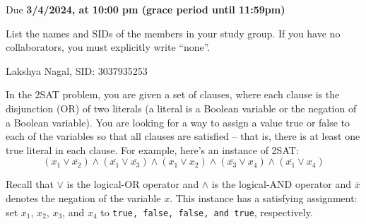 \documentclass[11pt]{article}
\def\duedate{3/4/2024, at 10:00 pm (grace period until 11:59pm)}
\begin{document}
\maketitle

Due \textbf{\duedate}

List the names and SIDs of the members in your study group.
If you have no collaborators, you must explicitly write ``none''.\\
\begin{solution}
    Lakshya Nagal, SID: 3037935253 
\end{solution}


In the 2SAT problem, you are given a set of clauses, where each clause is the disjunction (\textsc{OR}) of
two literals (a literal is a Boolean variable or the negation of a Boolean variable). You are looking
for a way to assign a value true or false to each of the variables so that all clauses are satisfied -- that is, there is at least one true literal in each clause. For example, here's an instance of 2SAT:
$$(x_1 \vee \overline{x_2} ) \wedge (\overline{x_1} \vee \overline{x_3} ) \wedge (x_1 \vee x_2 ) \wedge (\overline{x_3} \vee x_4 ) \wedge (\overline{x_1} \vee x_4)$$

Recall that $\vee$ is the logical-OR operator and $\wedge$ is the logical-AND operator and $\overline{x}$ denotes the negation of the variable $x$. This instance has a satisfying assignment: set $x_1$, $x_2$, $x_3$, and $x_4$ to \texttt{true, false, false, and
true}, respectively.
\end{document}
